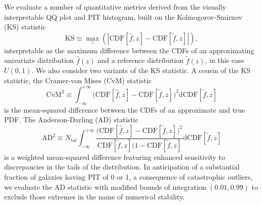 We evaluate a number of quantitative metrics derived from the visually interpretable QQ plot and PIT histogram, built on the Kolmogorov-Smirnov (KS) statistic
\begin{equation}
  \label{eq:ks}
  \mathrm{KS} \equiv \max_{z} \left( \left| \mathrm{CDF}[\hat{f}, z] - \mathrm{CDF}[\tilde{f}, z] \right| \right),
\end{equation}
interpretable as the maximum difference between the CDFs of an approximating univariate distribution $\hat{f}(z)$ and a reference distribution $\tilde{f}(z)$, in this case $U(0,1)$.
We also consider two variants of the KS statistic.
A cousin of the KS statistic, the Cramer-von Mises (CvM) statistic
\begin{equation}
\label{eq:cvm}
  \mathrm{CvM}^{2} \equiv \int_{-\infty}^{+\infty} \big(\mathrm{CDF}[\hat{f}, z] - \mathrm{CDF}[\tilde{f}, z]\big)^2 \mathrm{d}\mathrm{CDF}[\tilde{f}, z]
\end{equation}
is the mean-squared difference between the CDFs of an approximate and true PDF.
The Anderson-Darling (AD) statistic
\begin{equation} \label{eq:ad}
  \mathrm{AD}^2 \equiv N_{tot}\int_{-\infty}^{+\infty} \frac{\big(\mathrm{CDF}[\hat{f}, z] - \mathrm{CDF}[\tilde{f}, z]\big)^2} {\mathrm{CDF}[\tilde{f}, z] (1 -\mathrm{CDF}[\tilde{f}, z]} \mathrm{d}\mathrm{CDF}[\tilde{f}, z]
\end{equation}
is a weighted mean-squared difference featuring enhanced sensitivity to discrepancies in the tails of the distribution.
In anticipation of a substantial fraction of galaxies having PIT of 0 or 1, a consequence of catastrophic outliers, we evaluate the AD statistic with modified bounds of integration $(0.01, 0.99)$ to exclude those extremes in the name of numerical stability.

